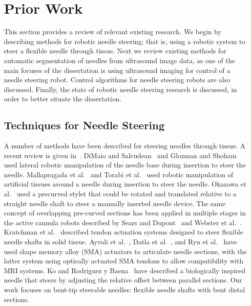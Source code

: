 \section{Prior Work}
This section provides a review of relevant existing research. We begin by describing methods for robotic needle steering; that is, using a robotic system to steer a flexible needle through tissue. Next we review existing methods for automatic segmentation of needles from ultrasound image data, as one of the main focuses of the dissertation is using ultrasound imaging for control of a needle steering robot. Control algorithms for needle steering robots are also discussed. Finally, the state of robotic needle steering research is discussed, in order to better situate the dissertation.

\subsection{Techniques for Needle Steering}
A number of methods have been described for steering needles through tissue. A recent review is given in~\cite{vandeBerg2014}. DiMaio and Salcudean~\cite{DiMaio2005} and Glozman and Shoham~\cite{Glozman2007} used lateral robotic manipulation of the needle base during insertion to steer the needle. Mallapragada et al.~\cite{Mallapragada2009} and Torabi et al.~\cite{Torabi2009} used robotic manipulation of artificial tissues around a needle during insertion to steer the needle. Okazawa et al.~\cite{Okazawa2005} used a precurved stylet that could be rotated and translated relative to a straight needle shaft to steer a manually inserted needle device. The same concept of overlapping pre-curved sections has been applied in multiple stages in the active cannula robots described by Sears and Dupont~\cite{Sears2006} and Webster et al.~\cite{Webster2009}. Kratchman et al.~\cite{Kratchman2011} described tendon actuation systems designed to steer flexible needle shafts in solid tissue. Ayvali et al.~\cite{Ayvali2012}, Datla et al.~\cite{Datla2014}, and Ryu et al.~\cite{Ryu2014} have used shape memory alloy (SMA) actuators to articulate needle sections, with the latter system using optically actuated SMA tendons to allow compatibility with MRI systems. Ko and Rodriguez y Baena~\cite{Ko2013} have described a biologically inspired needle that steers by adjusting the relative offset between parallel sections. Our work focuses on bent-tip steerable needles: flexible needle shafts with bent distal sections. 

